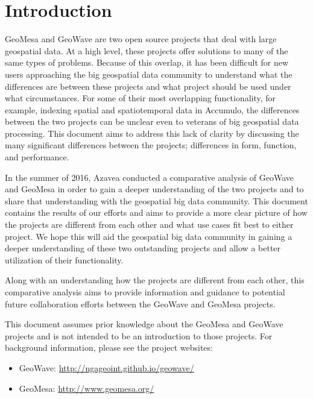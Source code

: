 \section{Introduction}
\label{sec:introduction}

GeoMesa and GeoWave are two open source projects that deal with large geospatial data.
At a high level, these projects offer solutions to many of the same types of problems.
Because of this overlap, it has been difficult for new users approaching the big geospatial data community to understand what the differences are between these projects and what project should be used under what circumstances.
For some of their most overlapping functionality, for example, indexing spatial and spatiotemporal data in Accumulo, the differences between the two projects can be unclear even to veterans of big geospatial data processing.
This document aims to address this lack of clarity by discussing the many significant differences between the projects;
differences in form, function, and performance.

In the summer of 2016, Azavea conducted a comparative analysis of GeoWave and GeoMesa in order to gain a deeper understanding of the two projects and to share that understanding with the geospatial big data community.
This document contains the results of our efforts and aims to provide a more clear picture of how the projects are different from each other and what use cases fit best to either project.
We hope this will aid the geospatial big data community in gaining a deeper understanding of these two outstanding projects and allow a better utilization of their functionality.

Along with an understanding how the projects are different from each other, this comparative analysis aims to provide information and guidance to potential future collaboration efforts between the GeoWave and GeoMesa projects.

This document assumes prior knowledge about the GeoMesa and GeoWave projects and is not intended to be an introduction to those projects.
For background information, please see the project websites:


\begin{itemize}
\item  GeoWave: \url{http://ngageoint.github.io/geowave/}
\item  GeoMesa: \url{http://www.geomesa.org/}
\end{itemize}
